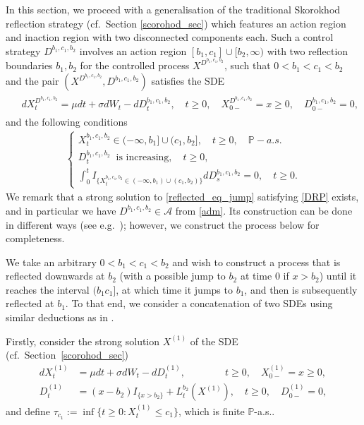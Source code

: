 \documentclass[11pt]{article} %
\def\Pr{\mathbb{P}}
\numberwithin{komcounter}{section}
\numberwithin{equation}{section}
\numberwithin{theorem}{section}
\begin{document}
In this section, we proceed with a generalisation of the traditional Skorokhod reflection strategy (cf.~Section \ref{scorohod_sec}) which features an action region and inaction region with two disconnected components each. 
Such a control strategy $D^{b_1,c_1,b_2}$ involves an action region $[b_1,c_1] \cup [b_2,\infty)$ with two reflection boundaries $b_1,b_2$ for the controlled process $X^{D^{b_1,c_1,b_2}}$, such that $ 0 < b_1 < c_1 < b_2$ and the pair $(X^{D^{b_1,c_1,b_2}},D^{b_1,c_1,b_2})$ satisfies the SDE 
\begin{align} \label{reflected_eq_jump}
\begin{split}
&dX^{D^{b_1,c_1,b_2}}_t = \mu dt + \sigma dW_t - dD^{b_1,c_1,b_2}_t, \quad t\geq 0, \quad X^{D^{b_1,c_1,b_2}}_{0-} = x \geq 0, \quad D^{b_1,c_1,b_2}_{0-} = 0,
\end{split}
\end{align}
and the following conditions
\begin{align} \label{DRP}
\begin{cases}
X^{b_1,c_1,b_2}_t\in (-\infty,b_1]\cup(c_1,b_2], \quad t\geq 0, \quad \Pr-a.s. \\
D^{b_1,c_1,b_2}_t \;\;\text{is increasing} , \quad t\geq 0, \\
\int_0^t I_{\{X^{b_1,c_1,b_2}_t\in (-\infty,b_1)\cup(c_1,b_2)\}} dD_s^{b_1,c_1,b_2} = 0, \quad t\geq 0.
\end{cases}
\end{align}
We remark that a strong solution to \eqref{reflected_eq_jump} satisfying \eqref{DRP} exists, and in particular we have $D^{b_1,c_1,b_2} \in \mathcal{A}$ from \eqref{adm}. 
Its construction can be done in different ways (see e.g.~\cite{junca2024optimal}); however, we construct the process below for completeness.

We take an arbitrary $0<b_1<c_1<b_2$ and wish to construct a process that is reflected downwards at $b_2$ (with a possible jump to $b_2$ at time $0$ if $x>b_2$) until it reaches the interval $(b_1c_1]$, at which time it jumps to $b_1$, and then is subsequently reflected at $b_1$. 
To that end, we consider a concatenation of two SDEs using similar deductions as in \cite[Section 4]{LIU2025128809}. 

Firstly, consider the strong solution $X^{(1)}$ of the SDE (cf.~Section~\ref{scorohod_sec})
\begin{align*}
dX_t^{(1)} 
&= \mu dt + \sigma dW_t - dD^{(1)}_t, \qquad \qquad t\geq 0, \quad X_{0-}^{(1)}=x\geq 0, \\
D^{(1)}_t 
&= (x-b_2)I_{\{x>b_2\}} + L^{b_2}_t(X^{(1)}), \quad t\geq 0,
\quad D^{(1)}_{0-}=0,
\end{align*}
and define $\tau_{c_1}:=\inf\{t\geq 0:X^{(1)}_{t}\leq c_1\}$, which is finite  $\mathbb{P}$-a.s..
\end{document}
